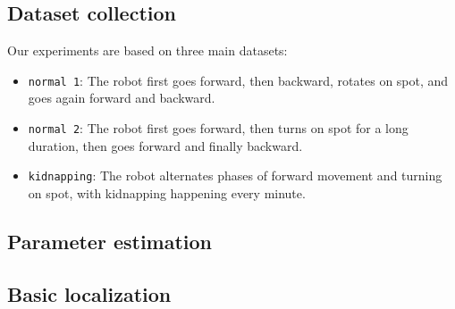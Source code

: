 \documentclass[letterpaper, 10pt, conference]{ieeeconf}
\begin{document}
\subsection{Dataset collection}

Our experiments are based on three main datasets:
\begin{itemize}
\item \texttt{normal 1}: The robot first goes forward, then backward, rotates on spot, and goes again forward and backward.
\item \texttt{normal 2}: The robot first goes forward, then turns on spot for a long duration, then goes forward and finally backward.
\item \texttt{kidnapping}: The robot alternates phases of forward movement and turning on spot, with kidnapping happening every minute.
\end{itemize}


\subsection{Parameter estimation}
\label{sec:mle}


\subsection{Basic localization}
\end{document}
